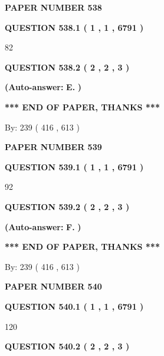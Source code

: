 \documentclass{ctexart}
\begin{document}
   
\newpage 
\setcounter{page}{ 
   538001 } 
   
   
 {\textbf{ \Large{ PAPER NUMBER  538  }}}
   
   
   
   
  
  
{\textbf{\large{QUESTION
538.1 
 ( 1 , 1 , 6791 )
}}}

82
  
  
{\textbf{\large{QUESTION
538.2 
 ( 2 , 2 , 3 )
}}}
 
 
{\textbf{(Auto-answer:}}
{\textbf{\large{
E.}}}
{\textbf{)}}
 
 
   
   
   
   
\vspace{1.0in} 
{\textbf{\large{ *** END OF PAPER, THANKS *** }}} 
   
   
\hspace{1.0in} By: 
 239 ( 416 ,  613 )
   
   
   
   
\newpage 
\setcounter{page}{ 
   539001 } 
   
   
 {\textbf{ \Large{ PAPER NUMBER  539  }}}
   
   
   
   
  
  
{\textbf{\large{QUESTION
539.1 
 ( 1 , 1 , 6791 )
}}}

92
  
  
{\textbf{\large{QUESTION
539.2 
 ( 2 , 2 , 3 )
}}}
 
 
{\textbf{(Auto-answer:}}
{\textbf{\large{
F.}}}
{\textbf{)}}
 
 
   
   
   
   
\vspace{1.0in} 
{\textbf{\large{ *** END OF PAPER, THANKS *** }}} 
   
   
\hspace{1.0in} By: 
 239 ( 416 ,  613 )
   
   
   
   
\newpage 
\setcounter{page}{ 
   540001 } 
   
   
 {\textbf{ \Large{ PAPER NUMBER  540  }}}
   
   
   
   
  
  
{\textbf{\large{QUESTION
540.1 
 ( 1 , 1 , 6791 )
}}}

120
  
  
{\textbf{\large{QUESTION
540.2 
 ( 2 , 2 , 3 )
}}}
 
\end{document}
